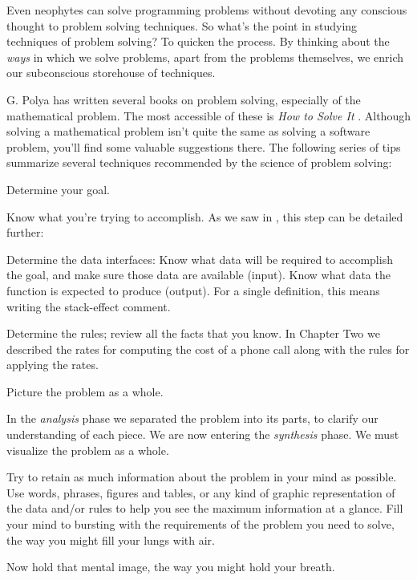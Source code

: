 Even neophytes can solve programming problems without devoting any
conscious thought to problem solving techniques. So what's the point in
studying techniques of problem solving? To quicken the process. By
thinking about the \emph{ways} in which we solve problems, apart from
the problems themselves, we enrich our subconscious storehouse of
techniques.

G. Polya has written several books on problem solving, especially of
the mathematical problem. The most accessible of these is
\emph{How to Solve It} \cite{polya}.
%
Although solving a mathematical problem isn't quite the same as
solving a software problem, you'll find some valuable suggestions there.
The following series of tips summarize several techniques recommended by
the science of problem solving:

\begin{tip}
Determine your goal.
\end{tip}
Know what you're trying to accomplish. As we saw in , this
step can be detailed further:

Determine the data interfaces: Know what data will be required to
accomplish the goal, and make sure those data are available (input).
Know what data the function is expected to produce (output). For a single
definition, this means writing the stack-effect comment.

Determine the rules;
review all the facts that you know. In Chapter Two we described the
rates for computing the cost of a phone call along with the rules for
applying the rates.

\begin{tip}
Picture the problem as a whole.
\end{tip}
In the \emph{analysis} phase we separated the problem into its parts, to
clarify our understanding of each piece. We are now entering the
\emph{synthesis} phase. We must visualize the problem as a whole.

Try to retain as much information about the problem in your mind
as possible. Use words, phrases, figures and tables, or any kind of graphic
representation of the data and/or rules to help you see the maximum
information at a glance. Fill your mind to bursting with the requirements
of the problem you need to solve, the way you might fill your lungs with
air.

Now hold that mental image, the way you might hold your breath.

